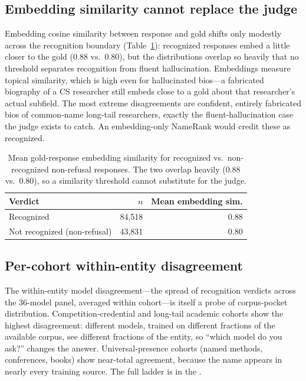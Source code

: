 \subsection{Embedding similarity cannot replace the judge}

Embedding cosine similarity between response and gold shifts only modestly across the recognition boundary (Table~\ref{tab:embedding}): recognized responses embed a little closer to the gold ($0.88$ vs.\ $0.80$), but the distributions overlap so heavily that no threshold separates recognition from fluent hallucination. Embeddings measure topical similarity, which is high even for hallucinated bios---a fabricated biography of a CS researcher still embeds close to a gold about that researcher's actual subfield. The most extreme disagreements are confident, entirely fabricated bios of common-name long-tail researchers, exactly the fluent-hallucination case the judge exists to catch. An embedding-only NameRank would credit these as recognized.

\begin{table}[!htbp]
\centering
\small
\caption{Mean gold-response embedding similarity for recognized vs.\ non-recognized non-refusal responses. The two overlap heavily ($0.88$ vs.\ $0.80$), so a similarity threshold cannot substitute for the judge.}
\label{tab:embedding}
\begin{tabular}{lrr}
\toprule
Verdict & $n$ & Mean embedding sim. \\
\midrule
Recognized & 84{,}518 & 0.88 \\
Not recognized (non-refusal) & 43{,}831 & 0.80 \\
\bottomrule
\end{tabular}
\end{table}

\subsection{Per-cohort within-entity disagreement}

The within-entity model disagreement---the spread of recognition verdicts across the $36$-model panel, averaged within cohort---is itself a probe of corpus-pocket distribution. Competition-credential and long-tail academic cohorts show the highest disagreement: different models, trained on different fractions of the available corpus, see different fractions of the entity, so ``which model do you ask?'' changes the answer. Universal-presence cohorts (named methods, conferences, books) show near-total agreement, because the name appears in nearly every training source. The full ladder is in the .

